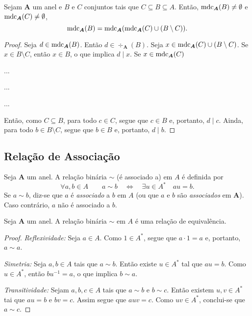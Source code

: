 \begin{prop}
	Sejam $\bm A$ um anel e $B$ e $C$ conjuntos tais que $C \subseteq B \subseteq A$. Então, $\operatorname{mdc}_{\bm A}(B) \neq \emptyset$ e $\operatorname{mdc}_{\bm A}(C) \neq \emptyset$,
	\begin{equation*}
	\operatorname{mdc}_{\bm A}(B) = \operatorname{mdc}_{\bm A}(\operatorname{mdc}_{\bm A}(C) \cup (B \setminus C)).
	\end{equation*}
\end{prop}
\begin{proof}
	Seja $d \in \operatorname{mdc}_{\bm A}(B)$. Então $d \in \div_{\bm A}(B)$. Seja $x \in \operatorname{mdc}_{\bm A}(C) \cup (B \setminus C)$. Se $x \in B \setminus C$, então $x \in B$, o que implica $d \mid x$. Se $x \in \operatorname{mdc}_{\bm A}(C)$

	...

	...

	...




	Então, como $C \subseteq B$, para todo $c \in C$, segue que $c \in B$ e, portanto, $d \mid c$. Ainda, para todo $b \in B \setminus C$, segue que $b \in B$ e, portanto, $d \mid b$.



\end{proof}









\subsection{Relação de Associação}

\begin{defi}
	Seja $\bm A$ um anel. A relação binária $\sim$ (é associado a) em $A$ é definida por
	\begin{equation*}
	\forall a,b \in A \qquad a \sim b \quad \Leftrightarrow \quad \exists u \in A^* \quad au=b.
	\end{equation*}
	Se $a \sim b$, diz-se que $a$ é \emph{associado} a $b$ em $A$ (ou que $a$ e $b$ são \emph{associados} em $\bm A$). Caso contrário, $a$ não é associado a $b$.
\end{defi}

\begin{prop}
	Seja $\bm A$ um anel. A relação binária $\sim$ em $A$ é uma relação de equivalência.
\end{prop}
\begin{proof}
	\emph{Reflexividade:} Seja $a \in A$. Como $1 \in A^*$, segue que $a\cdot 1=a$ e, portanto, $a \sim a$.

	\emph{Simetria:} Seja $a,b \in A$ tais que $a \sim b$. Então existe $u \in A^*$ tal que $au = b$. Como $u \in A^*$, então $bu^{-1} = a$, o que implica $b \sim a$.

	\emph{Transitividade:} Sejam $a,b,c \in A$ tais que $a \sim b$ e $b \sim c$. Então existem $u,v \in A^*$ tai que $au=b$ e $bv=c$. Assim segue que $auv=c$. Como $uv \in A^*$, conclui-se que $a \sim c$.
\end{proof}

